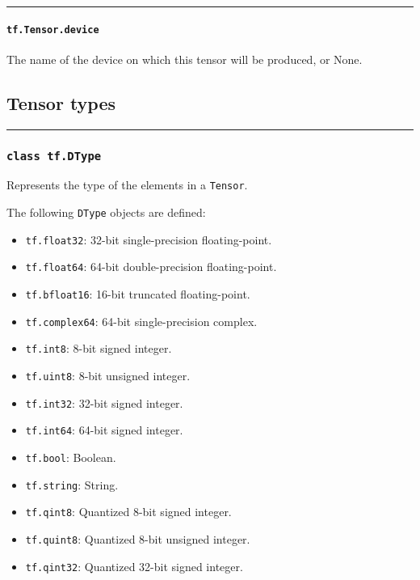 \begin{center}\rule{0.5\linewidth}{\linethickness}\end{center}

\paragraph{\texorpdfstring{\lstinline{tf.Tensor.device}
}{tf.Tensor.device }}\label{tf.tensor.device}

The name of the device on which this tensor will be produced, or None.

\subsection{Tensor types }\label{tensor-types}

\begin{center}\rule{0.5\linewidth}{\linethickness}\end{center}

\subsubsection{\texorpdfstring{\lstinline{class tf.DType}
}{class tf.DType }}\label{class-tf.dtype}

Represents the type of the elements in a \lstinline{Tensor}.

The following \lstinline{DType} objects are defined:

\begin{itemize}
\item
  \lstinline{tf.float32}: 32-bit single-precision floating-point.
\item
  \lstinline{tf.float64}: 64-bit double-precision floating-point.
\item
  \lstinline{tf.bfloat16}: 16-bit truncated floating-point.
\item
  \lstinline{tf.complex64}: 64-bit single-precision complex.
\item
  \lstinline{tf.int8}: 8-bit signed integer.
\item
  \lstinline{tf.uint8}: 8-bit unsigned integer.
\item
  \lstinline{tf.int32}: 32-bit signed integer.
\item
  \lstinline{tf.int64}: 64-bit signed integer.
\item
  \lstinline{tf.bool}: Boolean.
\item
  \lstinline{tf.string}: String.
\item
  \lstinline{tf.qint8}: Quantized 8-bit signed integer.
\item
  \lstinline{tf.quint8}: Quantized 8-bit unsigned integer.
\item
  \lstinline{tf.qint32}: Quantized 32-bit signed integer.
\end{itemize}

